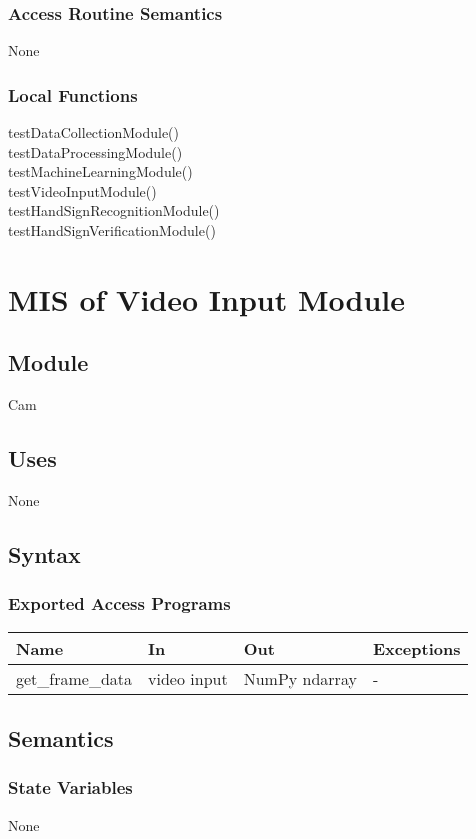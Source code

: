 \documentclass[12pt, titlepage]{article}
\begin{document}
\subsubsection{Access Routine Semantics}
None
\subsubsection{Local Functions}
testDataCollectionModule()\\
testDataProcessingModule()\\
testMachineLearningModule()\\
testVideoInputModule()\\
testHandSignRecognitionModule()\\
testHandSignVerificationModule()\\

\section{MIS of Video Input Module} \label{Module} 
\subsection{Module}
Cam
\subsection{Uses}
None
\subsection{Syntax}
\subsubsection{Exported Access Programs}
\begin{center}
\begin{tabular}{p{4cm} p{3cm} p{4cm} p{2cm}}
\hline
\textbf{Name} & \textbf{In} & \textbf{Out} & \textbf{Exceptions} \\
\hline
get\_frame\_data & video input & NumPy ndarray & - \\
\hline
\end{tabular}
\end{center}
\subsection{Semantics}
\subsubsection{State Variables}
None
\end{document}
